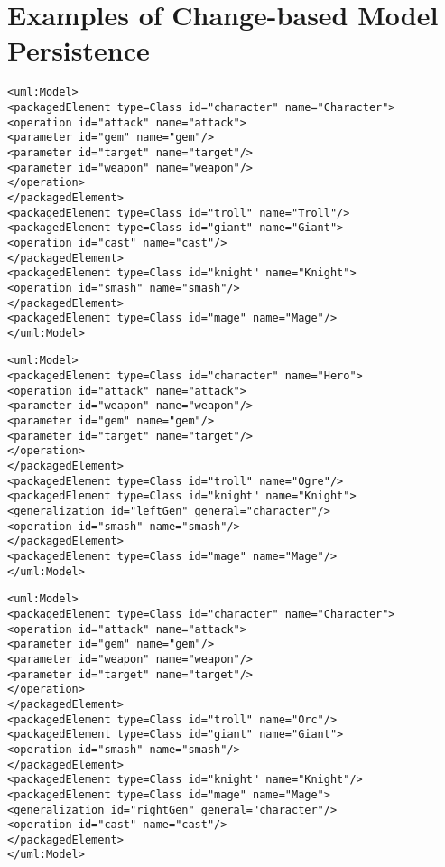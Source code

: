 \chapter{Examples of Change-based Model Persistence}
\label{sec:examples_of_cbp}

\vspace{-20pt}
\begin{lstlisting}[style=xmi,caption={Simplified XMI file of the original version in Figure \ref{fig:class_diagram_origin}.},label=lst:xmimodel_origin]
<uml:Model>
<packagedElement type=Class id="character" name="Character">
<operation id="attack" name="attack">
<parameter id="gem" name="gem"/>
<parameter id="target" name="target"/>
<parameter id="weapon" name="weapon"/>
</operation>
</packagedElement>
<packagedElement type=Class id="troll" name="Troll"/>
<packagedElement type=Class id="giant" name="Giant">
<operation id="cast" name="cast"/>
</packagedElement>
<packagedElement type=Class id="knight" name="Knight">
<operation id="smash" name="smash"/>
</packagedElement>
<packagedElement type=Class id="mage" name="Mage"/>
</uml:Model>
\end{lstlisting}

\vspace{-20pt}
\begin{lstlisting}[style=xmi,caption={Simplified XMI file of the left version in Figure \ref{fig:class_diagram_left}.},label=lst:xmimodel_left]
<uml:Model>
<packagedElement type=Class id="character" name="Hero">
<operation id="attack" name="attack">
<parameter id="weapon" name="weapon"/>
<parameter id="gem" name="gem"/>
<parameter id="target" name="target"/>
</operation>  
</packagedElement>
<packagedElement type=Class id="troll" name="Ogre"/>
<packagedElement type=Class id="knight" name="Knight">
<generalization id="leftGen" general="character"/>
<operation id="smash" name="smash"/>
</packagedElement>
<packagedElement type=Class id="mage" name="Mage"/>
</uml:Model>
\end{lstlisting}

\vspace{-20pt}
\begin{lstlisting}[style=xmi,caption={Simplified XMI file of the right version of Figure \ref{fig:class_diagram_right}.},label=lst:xmimodel_right]
<uml:Model>
<packagedElement type=Class id="character" name="Character">
<operation id="attack" name="attack">
<parameter id="gem" name="gem"/>
<parameter id="weapon" name="weapon"/>
<parameter id="target" name="target"/>
</operation>
</packagedElement>
<packagedElement type=Class id="troll" name="Orc"/>
<packagedElement type=Class id="giant" name="Giant">
<operation id="smash" name="smash"/>
</packagedElement>
<packagedElement type=Class id="knight" name="Knight"/>
<packagedElement type=Class id="mage" name="Mage">
<generalization id="rightGen" general="character"/>
<operation id="cast" name="cast"/>
</packagedElement>
</uml:Model>
\end{lstlisting}





